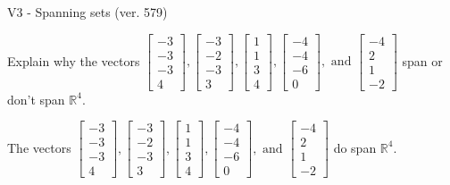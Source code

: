 \begin{exercise}
  \begin{exerciseTitle}V3 - Spanning sets (ver. 579)\end{exerciseTitle}
  \begin{exerciseStatement}
    Explain why the vectors \(\left[\begin{array}{r}
-3 \\
-3 \\
-3 \\
4
\end{array}\right] , \left[\begin{array}{r}
-3 \\
-2 \\
-3 \\
3
\end{array}\right] , \left[\begin{array}{r}
1 \\
1 \\
3 \\
4
\end{array}\right] , \left[\begin{array}{r}
-4 \\
-4 \\
-6 \\
0
\end{array}\right] , \text{ and } \left[\begin{array}{r}
-4 \\
2 \\
1 \\
-2
\end{array}\right]\) span or don't span \(\mathbb{R}^4\). 
	


  \end{exerciseStatement}
  \begin{exerciseAnswer}
   The vectors \(\left[\begin{array}{r}
-3 \\
-3 \\
-3 \\
4
\end{array}\right] , \left[\begin{array}{r}
-3 \\
-2 \\
-3 \\
3
\end{array}\right] , \left[\begin{array}{r}
1 \\
1 \\
3 \\
4
\end{array}\right] , \left[\begin{array}{r}
-4 \\
-4 \\
-6 \\
0
\end{array}\right] , \text{ and } \left[\begin{array}{r}
-4 \\
2 \\
1 \\
-2
\end{array}\right]\) 
  	 do  
	span \(\mathbb{R}^4\).
  



\end{exerciseAnswer}
\end{exercise}
